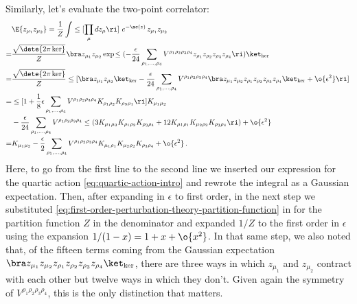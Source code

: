 Similarly, let's evaluate the two-point correlator:
\begin{align}\label{eq:second-moment-interaction}
&\E{z_{\mu_1}z_{\mu_2}}=\frac{1}{Z}\int \le[\prod_{\mu}d z_{\mu}\ri]\ e^{-\ac(z)}\,  z_{\mu_1}z_{\mu_2}\,  \\
=&\frac{\sqrt{\dete{2\pi\ker}}}{Z}\bra z_{\mu_1}z_{\mu_2}\exp\!\le(-\frac{\epsilon}{24}\sum_{\rho_1,\ldots,\rho_4}V^{\rho_1\rho_2\rho_3\rho_4}z_{\rho_1}z_{\rho_2}z_{\rho_3}z_{\rho_4}\ri)\ket_{\ker}\, \notag \\
=&\frac{\sqrt{\dete{2\pi\ker}}}{Z}\le[\bra z_{\mu_1}z_{\mu_2}\ket_{\ker}-\frac{\epsilon}{24}\sum_{\rho_1,\ldots,\rho_4}V^{\rho_1\rho_2\rho_3\rho_4}\bra z_{\mu_1}z_{\mu_2}z_{\rho_1}z_{\rho_2}z_{\rho_3}z_{\rho_4}\ket_{\ker}+\o{\epsilon^2}\ri]\, \nonumber\\
=&\le[1+\frac{1}{8}\epsilon  \sum_{\rho_1,\ldots,\rho_4}V^{\rho_1\rho_2\rho_3\rho_4} K_{\rho_1\rho_2}K_{\rho_3\rho_4}\ri]K_{\mu_1\mu_2}\, \nonumber\\
&-\frac{\epsilon}{24}\sum_{\rho_1,\ldots,\rho_4}V^{\rho_1\rho_2\rho_3\rho_4}\le(3K_{\mu_1\mu_2}K_{\rho_1\rho_2}K_{\rho_3\rho_4}+12K_{\mu_1\rho_1}K_{\mu_2\rho_2}K_{\rho_3\rho_4} \ri)+\o{\epsilon^2}  \, \nonumber\\
=&K_{\mu_1\mu_2}-\frac{\epsilon}{2}\sum_{\rho_1,\ldots,\rho_4}V^{\rho_1\rho_2\rho_3\rho_4}K_{\mu_1\rho_1}K_{\mu_2\rho_2}K_{\rho_3\rho_4}+\o{\epsilon^2}\, .\nonumber
\end{align}
Here, to go from the first line to the second line we inserted our expression for the quartic action \eqref{eq:quartic-action-intro} and rewrote the integral as a Gaussian expectation. Then, after expanding in $\epsilon$ to first order, in the next step
we substituted \eqref{eq:first-order-perturbation-theory-partition-function} in for the partition function  $Z$ in the denominator and expanded $1/Z$ to the first order in $\epsilon$ using the expansion $1/(1-x)=1+x+\o{x^2}$. In that same step, we also noted that, of the fifteen terms coming from the Gaussian expectation $\bra z_{\mu_1}z_{\mu_2}z_{\rho_1}z_{\rho_2}z_{\rho_3}z_{\rho_4}\ket_{\ker}$,
there are three ways in which $z_{\mu_1}$ and $z_{\mu_2}$ contract with each other but twelve ways in which they don't. Given again the symmetry of $V^{\rho_1\rho_2\rho_3\rho_4}$, this is the only distinction that matters.




